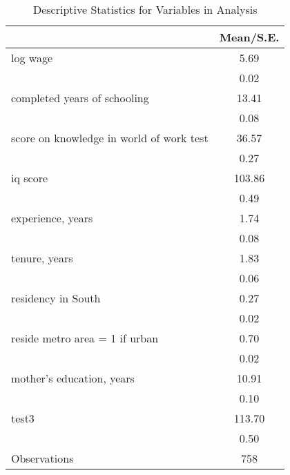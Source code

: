 \begin{table}[htbp]\centering
\caption{Descriptive Statistics for Variables in Analysis}
\begin{tabular}{l*{1}{c}}
\hline\hline
                    &   Mean/S.E.\\
\hline
log wage            &        5.69\\
                    &        0.02\\
completed years of schooling&       13.41\\
                    &        0.08\\
score on knowledge in world of work test&       36.57\\
                    &        0.27\\
iq score            &      103.86\\
                    &        0.49\\
experience, years   &        1.74\\
                    &        0.08\\
tenure, years       &        1.83\\
                    &        0.06\\
residency in South  &        0.27\\
                    &        0.02\\
reside metro area = 1 if urban&        0.70\\
                    &        0.02\\
mother's education, years&       10.91\\
                    &        0.10\\
test3               &      113.70\\
                    &        0.50\\
\hline
Observations        &         758\\
\hline\hline
\end{tabular}
\end{table}
